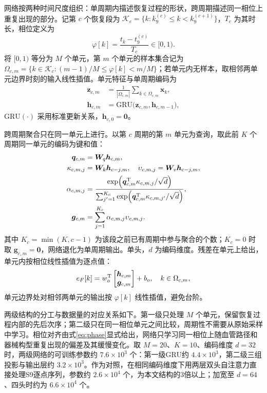 \documentclass{JQRnew}
\providecommand{\RevisionColor}{\color{black}}
\newcommand{\revbegin}{\begingroup\RevisionColor}
\newcommand{\revend}{\par\endgroup}
\begin{document}
\revbegin
网络按两种时间尺度组织：单周期内描述恢复过程的形状，跨周期描述同一相位上重复出现的部分。记第 $c$ 个恢复段为 $\mathcal K_c=\{k:k_9^{(c)}\le k<k_9^{(c+1)}\}$，$T_c$ 为其时长，相位定义为
\begin{equation}
\label{eq:phase}
\varphi[k]=\frac{t_k-t_9^{(c)}}{T_c}\in[0,1).
\end{equation}
将 $[0,1)$ 等分为 $M$ 个单元，第 $m$ 个单元的样本集合记为 $\Omega_{c,m}=\{k\in\mathcal K_c:(m-1)/M\le\varphi[k]<m/M\}$；若单元内无样本，取相邻两单元边界时刻的输入线性插值。单元特征与单周期编码为
\begin{equation}
\label{eq:cell-encoder}
\begin{aligned}
\bm z_{c,m}&=\frac{1}{|\Omega_{c,m}|}\sum_{k\in\Omega_{c,m}}\bm x_k,\\
\bm h_{c,m}&=\mathrm{GRU}\big(\bm z_{c,m},\bm h_{c,m-1}\big),
\end{aligned}
\end{equation}
$\mathrm{GRU}(\cdot)$ 采用标准更新关系，$\bm h_{c,0}=\bm 0$。
\revend

\revbegin
跨周期聚合只在同一单元上进行。以第 $c$ 周期的第 $m$ 单元为查询，取此前 $K$ 个周期同一单元的编码为键和值：
\begin{equation}
\label{eq:cross-cycle}
\begin{aligned}
\bm q_{c,m}&=\bm W_q\bm h_{c,m},\\
\kappa_{c,m,j}&=\bm W_k\bm h_{c-j,m},\quad
\upsilon_{c,m,j}=\bm W_v\bm h_{c-j,m},\\
\alpha_{c,m,j}&=\frac{\exp\!\left(\bm q_{c,m}^{\rm T}\kappa_{c,m,j}/\sqrt d\right)}
{\sum_{j'=1}^{K_c}\exp\!\left(\bm q_{c,m}^{\rm T}\kappa_{c,m,j'}/\sqrt d\right)},\\
\bm g_{c,m}&=\sum_{j=1}^{K_c}\alpha_{c,m,j}\upsilon_{c,m,j}.
\end{aligned}
\end{equation}
其中 $K_c=\min(K,c-1)$ 为该段之前已有周期中参与聚合的个数；$K_c=0$ 时取 $\bm g_{c,m}=\bm 0$，网络退化为单周期输出。单头，$d$ 为编码维度。残差在单元上给出，单元内按相位线性插值为逐点值：
\begin{equation}
\label{eq:cell-output}
e_F[k]=w_o^{\rm T}
\begin{bmatrix}\bm h_{c,m}\\\bm g_{c,m}\end{bmatrix}+b_o,
\quad k\in\Omega_{c,m},
\end{equation}
单元边界处对相邻两单元的输出按 $\varphi[k]$ 线性插值，避免台阶。
\revend

\revbegin
两级结构的分工与数据量的对应关系如下。第一级只处理 $M$ 个单元，保留恢复过程内部的先后次序；第二级只在同一相位单元之间比较，周期性不需要从原始采样中学习。相位对齐由式\eqref{eq:phase}显式给出，网络只学习同一相位上随血管路径和器械构型重复出现的偏差及其缓慢变化。取 $M=20$、$K=10$、编码维度 $d=32$ 时，两级网络的可训练参数约 $7.6\times10^3$ 个：第一级GRU约 $4.4\times10^3$，第二级三组投影与输出层约 $3.2\times10^3$。作为对照，在相同编码维度下用两层双头自注意力直接处理S9逐点序列，参数约 $2.6\times10^4$ 个，为本文结构的3倍以上；加宽至 $d=64$、四头时约为 $6.6\times10^4$ 个。
\revend
\end{document}
